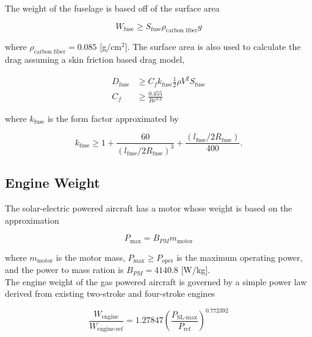 \documentclass[]{aiaa-tc}%
\begin{document}
The weight of the fuselage is based off of the surface area

\begin{equation}
    \label{e:fuseweight}
    W_{\text{fuse}} \geq S_{\text{fuse}} \rho_{\text{carbon fiber}} g
\end{equation} 

where $\rho_{\text{carbon fiber}} = 0.085$ [g/cm$^2$].\cite{carbonfiber}  The surface area is also used to calculate the drag assuming a skin friction based drag model,

\begin{align}
    \label{e:fusedrag}
    D_{\text{fuse}} &\geq C_f k_{\text{fuse}} \frac{1}{2} \rho V^2 S_{\text{fuse}} \\
    C_f &\geq \frac{0.455}{Re^{0.3}}
\end{align}

where $k_{\text{fuse}}$ is the form factor approximated by\cite{raymer}

\begin{equation}
    \label{e:fuseform}
    k_{\text{fuse}} \geq 1 + \frac{60}{(l_{\text{fuse}}/2R_{\text{fuse}})^3} + \frac{(l_{\text{fuse}}/2R_{\text{fuse}})}{400}.
\end{equation}

\subsection{Engine Weight}

The solar-electric powered aircraft has a motor whose weight is based on the approximation\cite{electricengine}

\begin{equation}
    \label{e:electricengine}
    P_{\text{max}} = B_{PM} m_{\text{motor}}
\end{equation}

where $m_{\text{motor}}$ is the motor mass, $P_{\text{max}} \geq P_{\text{oper}}$ is the maximum operating power, and the power to mass ration is $B_{PM} = 4140.8$ [W/kg]. \\

The engine weight of the gas powered aircraft is governed by a simple power law derived from existing two-stroke and four-stroke engines\cite{gasengine}

\begin{equation}
    \label{e:powerlaw}
    \frac{W_{\text{engine}}}{W_{\text{engine-ref}}} = 1.27847 \left(\frac{P_{\text{SL-max}}}{P_{\text{ref}}} \right)^{0.772392}
\end{equation}
\end{document}
